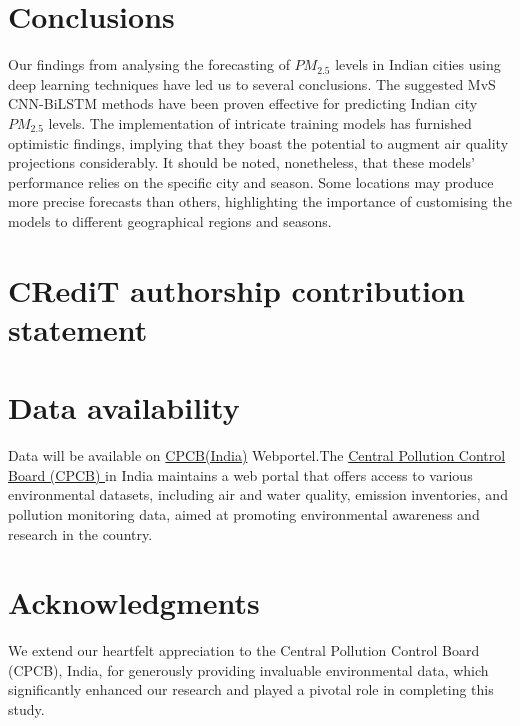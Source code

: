 \documentclass[a4paper, fleqn]{cas-sc}
\theoremstyle{definition}
\theoremstyle{remark}
\begin{document}
\section{Conclusions}
Our findings from analysing the forecasting of $PM_{2.5}$ levels in Indian cities using deep learning techniques have led us to several conclusions. The suggested MvS CNN-BiLSTM methods have been proven effective for predicting Indian city $PM_{2.5}$ levels. The implementation of intricate training models has furnished optimistic findings,  implying that they boast the potential to augment air quality projections considerably. It should be noted,  nonetheless,  that these models' performance relies on the specific city and season. Some locations may produce more precise forecasts than others,  highlighting the importance of customising the models to different geographical regions and seasons.


\section*{CRediT authorship contribution statement}

\section*{Data availability}
Data will be available on \href{https: //app.cpcbccr.com/ccr/#/caaqm-dashboard-all/caaqm-landing}{CPCB(India)} Webportel.The \href{https: //www.cpcb.nic.in/}{Central Pollution Control Board (CPCB) } in India maintains a web portal that offers access to various environmental datasets,  including air and water quality,  emission inventories,  and pollution monitoring data,  aimed at promoting environmental awareness and research in the country.
\section*{Acknowledgments}
We extend our heartfelt appreciation to the Central Pollution Control Board (CPCB),  India,  for generously providing invaluable environmental data,  which significantly enhanced our research and played a pivotal role in completing this study.
\label{}

\end{document}
